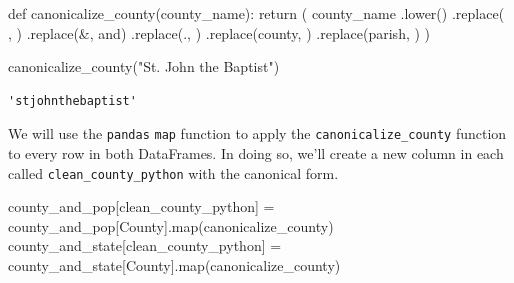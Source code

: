 \documentclass[
  letterpaper,
  DIV=11,
  numbers=noendperiod]{scrreprt}
\newenvironment{Shaded}{\begin{snugshade}}{\end{snugshade}}
\newcommand{\BuiltInTok}[1]{\textcolor[rgb]{0.00,0.23,0.31}{#1}}
\newcommand{\ControlFlowTok}[1]{\textcolor[rgb]{0.00,0.23,0.31}{#1}}
\newcommand{\KeywordTok}[1]{\textcolor[rgb]{0.00,0.23,0.31}{#1}}
\newcommand{\NormalTok}[1]{\textcolor[rgb]{0.00,0.23,0.31}{#1}}
\newcommand{\OperatorTok}[1]{\textcolor[rgb]{0.37,0.37,0.37}{#1}}
\newcommand{\StringTok}[1]{\textcolor[rgb]{0.13,0.47,0.30}{#1}}
\begin{document}
\begin{Shaded}
\begin{Highlighting}[]
\KeywordTok{def}\NormalTok{ canonicalize\_county(county\_name):}
    \ControlFlowTok{return}\NormalTok{ (}
\NormalTok{        county\_name}
\NormalTok{            .lower()}
\NormalTok{            .replace(}\StringTok{\textquotesingle{} \textquotesingle{}}\NormalTok{, }\StringTok{\textquotesingle{}\textquotesingle{}}\NormalTok{)}
\NormalTok{            .replace(}\StringTok{\textquotesingle{}\&\textquotesingle{}}\NormalTok{, }\StringTok{\textquotesingle{}and\textquotesingle{}}\NormalTok{)}
\NormalTok{            .replace(}\StringTok{\textquotesingle{}.\textquotesingle{}}\NormalTok{, }\StringTok{\textquotesingle{}\textquotesingle{}}\NormalTok{)}
\NormalTok{            .replace(}\StringTok{\textquotesingle{}county\textquotesingle{}}\NormalTok{, }\StringTok{\textquotesingle{}\textquotesingle{}}\NormalTok{)}
\NormalTok{            .replace(}\StringTok{\textquotesingle{}parish\textquotesingle{}}\NormalTok{, }\StringTok{\textquotesingle{}\textquotesingle{}}\NormalTok{)}
\NormalTok{    )}

\NormalTok{canonicalize\_county(}\StringTok{"St. John the Baptist"}\NormalTok{)}
\end{Highlighting}
\end{Shaded}

\begin{verbatim}
'stjohnthebaptist'
\end{verbatim}

We will use the \texttt{pandas} \texttt{map} function to apply the
\texttt{canonicalize\_county} function to every row in both DataFrames.
In doing so, we'll create a new column in each called
\texttt{clean\_county\_python} with the canonical form.

\begin{Shaded}
\begin{Highlighting}[]
\NormalTok{county\_and\_pop[}\StringTok{\textquotesingle{}clean\_county\_python\textquotesingle{}}\NormalTok{] }\OperatorTok{=}\NormalTok{ county\_and\_pop[}\StringTok{\textquotesingle{}County\textquotesingle{}}\NormalTok{].}\BuiltInTok{map}\NormalTok{(canonicalize\_county)}
\NormalTok{county\_and\_state[}\StringTok{\textquotesingle{}clean\_county\_python\textquotesingle{}}\NormalTok{] }\OperatorTok{=}\NormalTok{ county\_and\_state[}\StringTok{\textquotesingle{}County\textquotesingle{}}\NormalTok{].}\BuiltInTok{map}\NormalTok{(canonicalize\_county)}
\end{Highlighting}
\end{Shaded}
\end{document}
